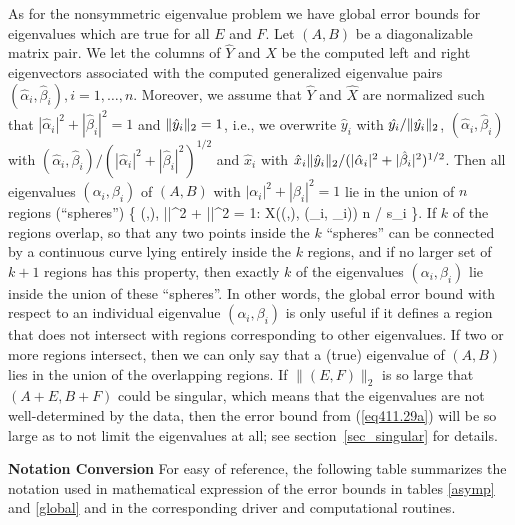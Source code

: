 As for the nonsymmetric eigenvalue problem we have global error bounds for
eigenvalues which are true for all $E$ and $F$.
Let $(A, B)$ be a diagonalizable matrix pair. We let the columns of
$\widehat{Y}$ and $\widehat{X}$ be the computed left and right
eigenvectors associated with
the computed generalized eigenvalue pairs
$({\hat{\alpha}}_i, {\hat{\beta}}_i), i = 1, \ldots, n$.
Moreover, we assume that $\widehat{Y}$ and $\widehat{X}$
are normalized such that $|\hat{\alpha}_i|^2 + |\hat{\beta}_i|^2 = 1$
and $\|\hat{y}_i\|_2 = 1$, i.e., we
overwrite $\hat{y}_i$ with  $\hat{y_i}/ \|\hat{y_i}\|_2$, $({\hat{\alpha}}_i,
{\hat{\beta}}_i)$ with  $({\hat{\alpha}}_i, {\hat{\beta}}_i) /
(|\hat{\alpha}_i|^2 + |\hat{\beta}_i|^2)^{1/2}$ and $\hat{x}_i$ with
$\hat{x}_i \|\hat{y}_i\|_2 / (|\hat{\alpha}_i|^2 + |\hat{\beta}_i|^2)^{1/2}$.
Then all eigenvalues $({\alpha}_i, {\beta}_i)$ of $(A, B)$ with
$|{\alpha}_i|^2 + |{\beta}_i|^2 = 1$ lie in the union of $n$ regions
(``spheres'')
\bq\label{eq411.29a}
\left\{  (\alpha,\beta), |\alpha|^2 + |\beta|^2 = 1:
{\cal X}((\alpha,\beta), ({\hat{\alpha}}_i, {\hat{\beta}}_i))
\leq n / s_i \right\}.
\eq
If $k$ of the regions overlap, so that any two points inside the $k$
``spheres''
can be connected by a continuous curve lying entirely inside the $k$ regions,
and if no larger set of $k + 1$ regions has this property,
then exactly $k$ of the
eigenvalues  $({\alpha}_i, {\beta}_i)$ lie inside the union of these
``spheres''.
In other words, the global error bound with respect to an individual eigenvalue
$({\alpha}_i,{\beta}_i)$ is only useful if it defines a region
that does not intersect with regions corresponding to other eigenvalues.
If two or more regions intersect,
then we can only say that a (true) eigenvalue of $(A, B)$ lies in
the union of the overlapping regions. If $\|(E,F)\|_2$ is so large
that $(A+E,B+F)$ could be singular, which means that the eigenvalues
are not well-determined by the data, then the error bound from
(\ref{eq411.29a}) will be so large as to not limit the eigenvalues at all;
see section~\ref{sec_singular} for details.

{\bf Notation Conversion} For easy of reference,
the following table summarizes the notation used in mathematical
expression of the error bounds in tables \ref{asymp} and \ref{global}
and in the corresponding driver and computational routines.

